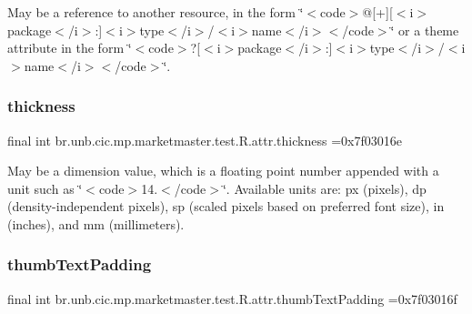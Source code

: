 May be a reference to another resource, in the form \char`\"{}$<$code$>$@\mbox{[}+\mbox{]}\mbox{[}$<$i$>$package$<$/i$>$\+:\mbox{]}$<$i$>$type$<$/i$>$/$<$i$>$name$<$/i$>$$<$/code$>$\char`\"{} or a theme attribute in the form \char`\"{}$<$code$>$?\mbox{[}$<$i$>$package$<$/i$>$\+:\mbox{]}$<$i$>$type$<$/i$>$/$<$i$>$name$<$/i$>$$<$/code$>$\char`\"{}. \mbox{\label{classbr_1_1unb_1_1cic_1_1mp_1_1marketmaster_1_1test_1_1R_1_1attr_aff173f44487d273dbe0cdfb84d6826ec}} 
\subsubsection{\texorpdfstring{thickness}{thickness}}
{\footnotesize\ttfamily final int br.\+unb.\+cic.\+mp.\+marketmaster.\+test.\+R.\+attr.\+thickness =0x7f03016e\hspace{0.3cm}{\ttfamily [static]}}

May be a dimension value, which is a floating point number appended with a unit such as \char`\"{}$<$code$>$14.\+5sp$<$/code$>$\char`\"{}. Available units are\+: px (pixels), dp (density-\/independent pixels), sp (scaled pixels based on preferred font size), in (inches), and mm (millimeters). \mbox{\label{classbr_1_1unb_1_1cic_1_1mp_1_1marketmaster_1_1test_1_1R_1_1attr_a5efc5bf719f481f135cfdd92c89676d3}} 
\subsubsection{\texorpdfstring{thumb\+Text\+Padding}{thumbTextPadding}}
{\footnotesize\ttfamily final int br.\+unb.\+cic.\+mp.\+marketmaster.\+test.\+R.\+attr.\+thumb\+Text\+Padding =0x7f03016f\hspace{0.3cm}{\ttfamily [static]}}

